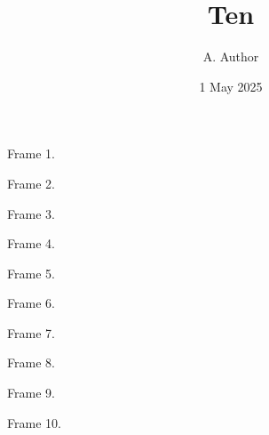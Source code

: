 \documentclass[8pt]{beamer}
\title{Ten}
\author{A. Author}
\date{1 May 2025}
\begin{document}
\begin{frame}
Frame 1.
\end{frame}
\begin{frame}
Frame 2.
\end{frame}
\begin{frame}
Frame 3.
\end{frame}
\begin{frame}
Frame 4.
\end{frame}
\begin{frame}
Frame 5.
\end{frame}
\begin{frame}
Frame 6.
\end{frame}
\begin{frame}
Frame 7.
\end{frame}
\begin{frame}
Frame 8.
\end{frame}
\begin{frame}
Frame 9.
\end{frame}
\begin{frame}
Frame 10.
\end{frame}
\end{document}
